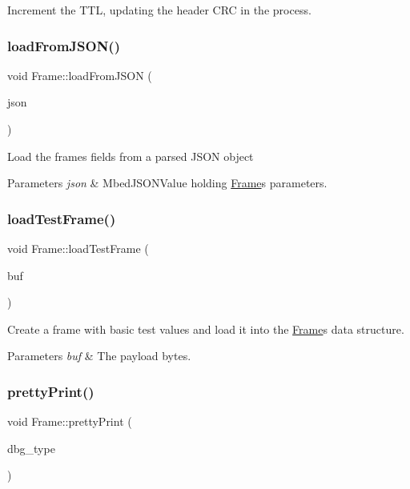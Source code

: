 Increment the T\+TL, updating the header C\+RC in the process. \mbox{\label{classFrame_a2ef721542c17f972913df4375d72f7bf}} 
\subsubsection{\texorpdfstring{load\+From\+J\+S\+O\+N()}{loadFromJSON()}}
{\footnotesize\ttfamily void Frame\+::load\+From\+J\+S\+ON (\begin{DoxyParamCaption}\item[{Mbed\+J\+S\+O\+N\+Value \&}]{json }\end{DoxyParamCaption})}

Load the frame\textquotesingle{}s fields from a parsed J\+S\+ON object 
\begin{DoxyParams}{Parameters}
{\em json} & Mbed\+J\+S\+O\+N\+Value holding \hyperlink{classFrame}{Frame}\textquotesingle{}s parameters. \\
\hline
\end{DoxyParams}
\mbox{\label{classFrame_ae0082da89627bc112701735227104eec}} 
\subsubsection{\texorpdfstring{load\+Test\+Frame()}{loadTestFrame()}}
{\footnotesize\ttfamily void Frame\+::load\+Test\+Frame (\begin{DoxyParamCaption}\item[{vector$<$ uint8\+\_\+t $>$ \&}]{buf }\end{DoxyParamCaption})}

Create a frame with basic test values and load it into the \hyperlink{classFrame}{Frame}\textquotesingle{}s data structure. 
\begin{DoxyParams}{Parameters}
{\em buf} & The payload bytes. \\
\hline
\end{DoxyParams}
\mbox{\label{classFrame_a6fba80bf6639a27ffffb612e64cf6844}} 
\subsubsection{\texorpdfstring{pretty\+Print()}{prettyPrint()}}
{\footnotesize\ttfamily void Frame\+::pretty\+Print (\begin{DoxyParamCaption}\item[{const enum D\+B\+G\+\_\+\+T\+Y\+P\+ES}]{dbg\+\_\+type }\end{DoxyParamCaption})}


